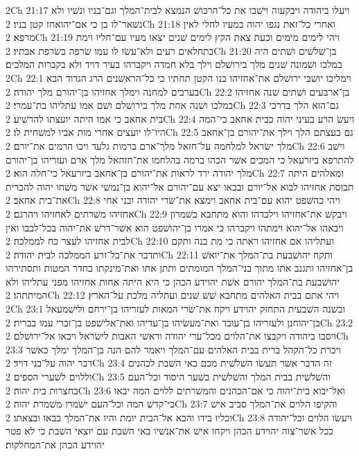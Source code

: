 2Ch 21:17  ויעלו ביהודה ויבקעוה וישׁבו את כל־הרכושׁ הנמצא לבית־המלך וגם־בניו ונשׁיו ולא נשׁאר־לו בן כי אם־יהואחז קטן בניו׃
2Ch 21:18  ואחרי כל־זאת נגפו יהוה במעיו לחלי לאין מרפא׃
2Ch 21:19  ויהי לימים מימים וכעת צאת הקץ לימים שׁנים יצאו מעיו עם־חליו וימת בתחלאים רעים ולא־עשׂו לו עמו שׂרפה כשׂרפת אבתיו׃
2Ch 21:20  בן־שׁלשׁים ושׁתים היה במלכו ושׁמונה שׁנים מלך בירושׁלם וילך בלא חמדה ויקברהו בעיר דויד ולא בקברות המלכים׃
2Ch 22:1  וימליכו יושׁבי ירושׁלם את־אחזיהו בנו הקטן תחתיו כי כל־הראשׁנים הרג הגדוד הבא בערבים למחנה וימלך אחזיהו בן־יהורם מלך יהודה׃
2Ch 22:2  בן־ארבעים ושׁתים שׁנה אחזיהו במלכו ושׁנה אחת מלך בירושׁלם ושׁם אמו עתליהו בת־עמרי׃
2Ch 22:3  גם־הוא הלך בדרכי בית אחאב כי אמו היתה יועצתו להרשׁיע׃
2Ch 22:4  ויעשׂ הרע בעיני יהוה כבית אחאב כי־המה היו־לו יועצים אחרי מות אביו למשׁחית לו׃
2Ch 22:5  גם בעצתם הלך וילך את־יהורם בן־אחאב מלך ישׂראל למלחמה על־חזאל מלך־ארם ברמות גלעד ויכו הרמים את־יורם׃
2Ch 22:6  וישׁב להתרפא ביזרעאל כי המכים אשׁר הכהו ברמה בהלחמו את־חזהאל מלך ארם ועזריהו בן־יהורם מלך יהודה ירד לראות את־יהורם בן־אחאב ביזרעאל כי־חלה הוא׃
2Ch 22:7  ומאלהים היתה תבוסת אחזיהו לבוא אל־יורם ובבאו יצא עם־יהורם אל־יהוא בן־נמשׁי אשׁר משׁחו יהוה להכרית את־בית אחאב׃
2Ch 22:8  ויהי כהשׁפט יהוא עם־בית אחאב וימצא את־שׂרי יהודה ובני אחי אחזיהו משׁרתים לאחזיהו ויהרגם׃
2Ch 22:9  ויבקשׁ את־אחזיהו וילכדהו והוא מתחבא בשׁמרון ויבאהו אל־יהוא וימתהו ויקברהו כי אמרו בן־יהושׁפט הוא אשׁר־דרשׁ את־יהוה בכל־לבבו ואין לבית אחזיהו לעצר כח לממלכה׃
2Ch 22:10  ועתליהו אם אחזיהו ראתה כי מת בנה ותקם ותדבר את־כל־זרע הממלכה לבית יהודה׃
2Ch 22:11  ותקח יהושׁבעת בת־המלך את־יואשׁ בן־אחזיהו ותגנב אתו מתוך בני־המלך המומתים ותתן אתו ואת־מינקתו בחדר המטות ותסתירהו יהושׁבעת בת־המלך יהורם אשׁת יהוידע הכהן כי היא היתה אחות אחזיהו מפני עתליהו ולא המיתתהו׃
2Ch 22:12  ויהי אתם בבית האלהים מתחבא שׁשׁ שׁנים ועתליה מלכת על־הארץ׃
2Ch 23:1  ובשׁנה השׁבעית התחזק יהוידע ויקח את־שׂרי המאות לעזריהו בן־ירחם ולישׁמעאל בן־יהוחנן ולעזריהו בן־עובד ואת־מעשׂיהו בן־עדיהו ואת־אלישׁפט בן־זכרי עמו בברית׃
2Ch 23:2  ויסבו ביהודה ויקבצו את־הלוים מכל־ערי יהודה וראשׁי האבות לישׂראל ויבאו אל־ירושׁלם׃
2Ch 23:3  ויכרת כל־הקהל ברית בבית האלהים עם־המלך ויאמר להם הנה בן־המלך ימלך כאשׁר דבר יהוה על־בני דויד׃
2Ch 23:4  זה הדבר אשׁר תעשׂו השׁלשׁית מכם באי השׁבת לכהנים וללוים לשׁערי הספים׃
2Ch 23:5  והשׁלשׁית בבית המלך והשׁלשׁית בשׁער היסוד וכל־העם בחצרות בית יהוה׃
2Ch 23:6  ואל־יבוא בית־יהוה כי אם־הכהנים והמשׁרתים ללוים המה יבאו כי־קדשׁ המה וכל־העם ישׁמרו משׁמרת יהוה׃
2Ch 23:7  והקיפו הלוים את־המלך סביב אישׁ וכליו בידו והבא אל־הבית יומת והיו את־המלך בבאו ובצאתו׃
2Ch 23:8  ויעשׂו הלוים וכל־יהודה ככל אשׁר־צוה יהוידע הכהן ויקחו אישׁ את־אנשׁיו באי השׁבת עם יוצאי השׁבת כי לא פטר יהוידע הכהן את־המחלקות׃
